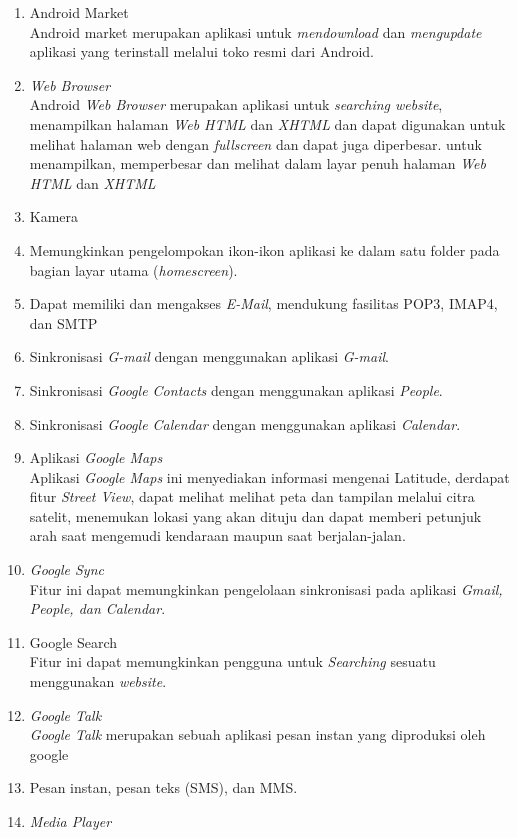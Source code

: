 \begin{enumerate}
\begin{enumerate}
\item Android Market\\ 
Android market merupakan aplikasi untuk \textit{mendownload} dan \textit{mengupdate} aplikasi yang terinstall melalui toko resmi dari Android.
\item \textit{Web Browser}\\
Android \textit{Web Browser} merupakan aplikasi untuk \textit{searching website}, menampilkan halaman \textit{Web HTML} dan \textit{XHTML} dan dapat digunakan untuk melihat halaman web dengan \textit{fullscreen} dan dapat juga diperbesar.
untuk menampilkan, memperbesar dan melihat dalam layar penuh halaman \textit{Web HTML} dan \textit{XHTML}
\item Kamera
\item Memungkinkan pengelompokan ikon-ikon aplikasi ke dalam satu folder pada bagian layar utama (\textit{homescreen}).
\item Dapat memiliki dan mengakses \textit{E-Mail}, mendukung fasilitas POP3, IMAP4, dan SMTP
\item Sinkronisasi \textit{G-mail} dengan menggunakan aplikasi \textit{G-mail}.
\item Sinkronisasi \textit{Google Contacts} dengan menggunakan aplikasi \textit{People}.
\item Sinkronisasi \textit{Google Calendar} dengan menggunakan aplikasi \textit{Calendar}.
\item Aplikasi \textit{Google Maps} \\
Aplikasi \textit{Google Maps} ini menyediakan informasi mengenai Latitude, derdapat fitur \textit{Street View}, dapat melihat melihat peta dan tampilan melalui citra satelit, menemukan lokasi yang akan dituju dan dapat memberi petunjuk arah saat mengemudi kendaraan maupun saat berjalan-jalan.
\item \textit{Google Sync}\\ 
Fitur ini dapat memungkinkan pengelolaan sinkronisasi pada aplikasi \textit{Gmail, People, dan Calendar}.
\item Google Search\\
Fitur ini dapat memungkinkan pengguna untuk \textit{Searching} sesuatu menggunakan \textit{website}.
\item \textit{Google Talk} \\
\textit{Google Talk} merupakan sebuah aplikasi pesan instan yang diproduksi oleh google
\item Pesan instan, pesan teks (SMS), dan MMS.
\item \textit{Media Player}\\

\end{enumerate}
\end{enumerate}
